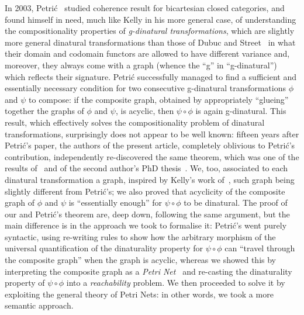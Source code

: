 In 2003, Petri\'c~\cite{petric_g-dinaturality_2003} studied coherence result for bicartesian closed categories, and found himself in need, much like Kelly in his more general case, of understanding the compositionality properties of \emph{g-dinatural transformations}, which are slightly more general dinatural transformations than those of Dubuc and Street~\cite{dubuc_dinatural_1970} in what their domain and codomain functors are allowed to have different variance and, moreover, they always come with a graph (whence the ``g'' in ``g-dinatural'') which reflects their signature. Petri\'c successfully managed to find a sufficient and essentially necessary condition for two consecutive g-dinatural transformations $\phi$ and $\psi$ to compose: if the composite graph, obtained by appropriately ``glueing'' together the graphs of $\phi$ and $\psi$, is acyclic, then $\psi\circ\phi$ is again g-dinatural. This result, which effectively solves the compositionality problem of dinatural transformations, 
surprisingly does not appear to be well known: 
fifteen years after Petri\'c's paper, the authors of the present article, completely oblivious to Petri\'c's contribution, independently re-discovered the same theorem, which was one of the results of~\cite{mccusker_compositionality_2018} and of the second author's PhD thesis~\cite{santamaria_towards_2019}\footnotemark. We, too, associated to each dinatural transformation a graph, inspired by Kelly's work of~\cite{kelly_many-variable_1972}, such graph being slightly different from Petri\'c's; we also proved that acyclicity of the composite graph of $\phi$ and $\psi$ is ``essentially enough'' for $\psi\circ\phi$ to be dinatural. The proof of our and Petri\'c's theorem are, deep down, following the same argument, but the main difference is in the approach we took to formalise it: Petri\'c's went purely syntactic, using re-writing rules to show how the arbitrary morphism of the universal quantification of the dinaturality property for $\psi\circ\phi$ can ``travel through the composite graph'' when the graph is acyclic, whereas we showed this by interpreting the composite graph as a \emph{Petri Net}~\cite{petri_kommunikation_1962} and re-casting the dinaturality property of $\psi\circ\phi$ into a \emph{reachability} problem. We then proceeded to solve it by exploiting the general theory of Petri Nets: in other words, we took a more semantic approach.


